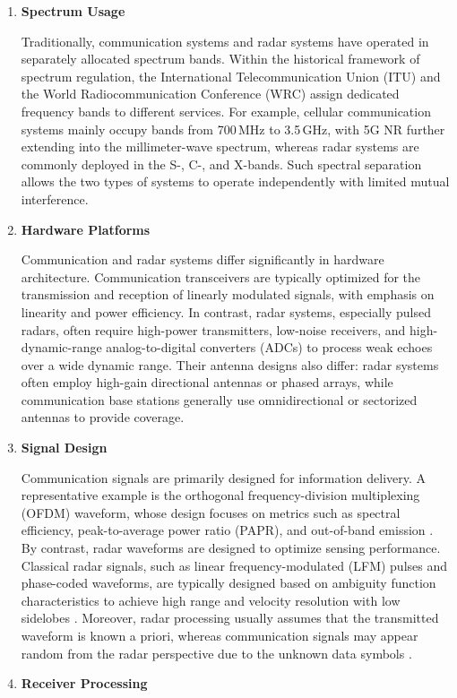 \begin{enumerate}[label=(\arabic*)]
    \item \textbf{Spectrum Usage}
    
    Traditionally, communication systems and radar systems have operated in separately allocated spectrum bands. Within the historical framework of spectrum regulation, the International Telecommunication Union (ITU) and the World Radiocommunication Conference (WRC) assign dedicated frequency bands to different services. For example, cellular communication systems mainly occupy bands from 700\,MHz to 3.5\,GHz, with 5G NR further extending into the millimeter-wave spectrum, whereas radar systems are commonly deployed in the S-, C-, and X-bands. Such spectral separation allows the two types of systems to operate independently with limited mutual interference.
    
    \item \textbf{Hardware Platforms}
    
    Communication and radar systems differ significantly in hardware architecture. Communication transceivers are typically optimized for the transmission and reception of linearly modulated signals, with emphasis on linearity and power efficiency. In contrast, radar systems, especially pulsed radars, often require high-power transmitters, low-noise receivers, and high-dynamic-range analog-to-digital converters (ADCs) to process weak echoes over a wide dynamic range. Their antenna designs also differ: radar systems often employ high-gain directional antennas or phased arrays, while communication base stations generally use omnidirectional or sectorized antennas to provide coverage.
    
    \item \textbf{Signal Design}
    \begin{sloppypar}
    Communication signals are primarily designed for information delivery. A representative example is the orthogonal frequency-division multiplexing (OFDM) waveform, whose design focuses on metrics such as spectral efficiency, peak-to-average power ratio (PAPR), and out-of-band emission \cite{Goldsmith2005,Andrews2014}. By contrast, radar waveforms are designed to optimize sensing performance. Classical radar signals, such as linear frequency-modulated (LFM) pulses and phase-coded waveforms, are typically designed based on ambiguity function characteristics to achieve high range and velocity resolution with low sidelobes \cite{Levanon2004}. Moreover, radar processing usually assumes that the transmitted waveform is known a priori, whereas communication signals may appear random from the radar perspective due to the unknown data symbols \cite{Liu2020JointRadarComm,Zhang2021ISAC6G}.
    \end{sloppypar}
    \item \textbf{Receiver Processing}
    

\end{enumerate}
